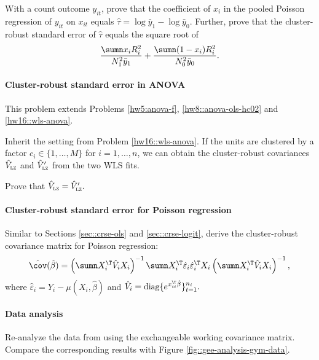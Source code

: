 With a count outcome $y_{it}$, prove that the coefficient of $x_i$ in the pooled Poisson regression of $y_{it}$ on $x_{it} $ equals $ \hat{\tau} =  \log \bar{y}_1 -  \log \bar{y}_0$. Further, prove that the cluster-robust standard error of $ \hat{\tau}$ equals the square root of
$$
\frac{  \sumn x_i R_i^2 }{ N_1^2 \bar{y}_1  }   +  \frac{ \sumn (1-x_i) R_i^2 }{  N_0^2 \bar{y}_0   } . 
$$


\paragraph{Cluster-robust standard error in ANOVA}\label{hw21::crse-anova}


This problem extends Problems \ref{hw5:anova-f}, \ref{hw8::anova-ols-hc02} and \ref{hw16::wls-anova}. 

Inherit the setting from Problem \ref{hw16::wls-anova}. 
If the units are clustered by a factor $c_i \in \{1, \ldots, M\}$ for $i=1,\ldots, n$, we can obtain the cluster-robust covariances $\hat{V}_\textsc{lz}$ and $\hat{V}_\textsc{lz}'$ from the two WLS fits. 

Prove that $\hat{V}_\textsc{lz} = \hat{V}_\textsc{lz}'.$  




 
\paragraph{Cluster-robust standard error for Poisson regression}\label{hw21::poisson-crse}

Similar to Sections \ref{sec::crse-ols} and \ref{sec::crse-logit}, derive the cluster-robust covariance matrix for Poisson regression:
\[
\hat{\cov}(\hat{\beta})=\left(\sumn X_{i}^{\T}\hat{V}_{i}X_{i}\right)^{-1}\sumn X_{i}^{\T}\hat{\varepsilon}_{i}\hat{\varepsilon}_{i}^{\T}X_{i}\left(\sumn X_{i}^{\T}\hat{V}_{i}X_{i}\right)^{-1},
\]
where $\hat{\varepsilon}_{i}=Y_{i}- \mu(X_{i}, \hat{\beta})$ and $\hat{V}_{i}=\text{diag}\{e^{x_{it}^{\T}\hat{\beta}}\}_{t=1}^{n_{i}}.$




%

 

\paragraph{Data analysis}

Re-analyze the data from \citet{royer2015incentives} using the exchangeable working covariance matrix. Compare the corresponding results with Figure \ref{fig::gee-analysis-gym-data}. 
 
